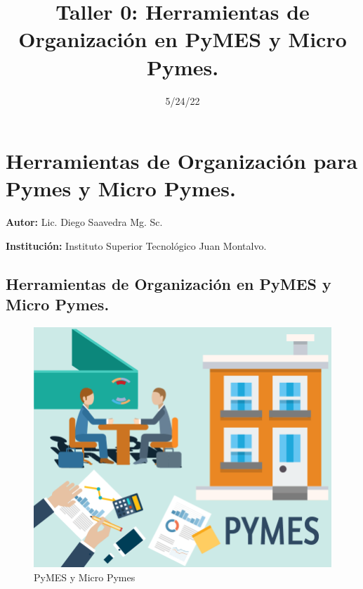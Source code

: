 \documentclass[
  letterpaper,
  DIV=11,
  numbers=noendperiod]{scrartcl}
\title{Taller 0: Herramientas de Organización en PyMES y Micro Pymes.}
\author{}
\date{5/24/22}
\begin{document}
\maketitle
\ifdefined\Shaded\renewenvironment{Shaded}{\begin{tcolorbox}[interior hidden, sharp corners, enhanced, frame hidden, breakable, boxrule=0pt, borderline west={3pt}{0pt}{shadecolor}]}{\end{tcolorbox}}\fi

\hypertarget{herramientas-de-organizaciuxf3n-para-pymes-y-micro-pymes.}{%
\section{Herramientas de Organización para Pymes y Micro
Pymes.}\label{herramientas-de-organizaciuxf3n-para-pymes-y-micro-pymes.}}

\textbf{Autor:} Lic. Diego Saavedra Mg. Sc.

\textbf{Institución:} Instituto Superior Tecnológico Juan Montalvo.

\hypertarget{herramientas-de-organizaciuxf3n-en-pymes-y-micro-pymes.}{%
\subsection{Herramientas de Organización en PyMES y Micro
Pymes.}\label{herramientas-de-organizaciuxf3n-en-pymes-y-micro-pymes.}}

\begin{figure}

{\centering \includegraphics{media/pymes-babos.png}

}

\caption{PyMES y Micro Pymes}

\end{figure}
\end{document}
